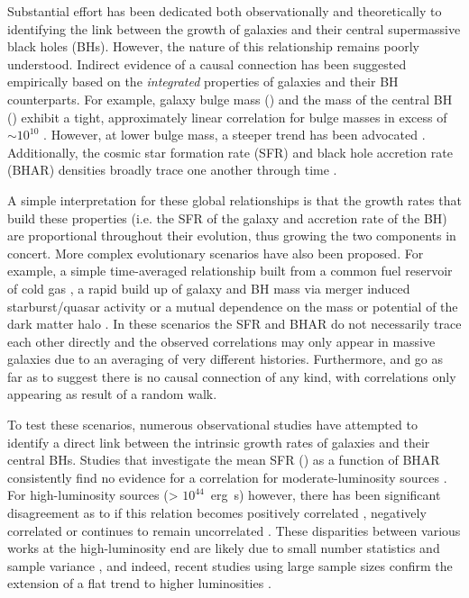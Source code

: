 Substantial effort has been dedicated both observationally and theoretically to
identifying the link between the growth of galaxies and their central
supermassive black holes (BHs). However, the nature of this relationship
remains poorly understood.  Indirect evidence of a causal connection has been
suggested empirically based on the \textit{integrated} properties of galaxies
and their BH counterparts. For example, galaxy bulge mass () and
the mass of the central BH () exhibit a tight, approximately linear
correlation for bulge masses in excess of  $\sim 10^{10}$\Msol
\citep[e.g,][]{Magorrian1998,Kormendy2013,McConnellandMa2013,Scott2013}.
However, at lower bulge mass, a steeper trend has been advocated
\citep[e.g,][]{Scott2013,Greene2016}.  Additionally, the cosmic star formation
rate (SFR) and black hole accretion rate (BHAR) densities broadly trace one
another through time
\citep[e.g,][]{Heckman2004,Aird2010,MadauandDickinson2014}.

A simple interpretation for these global relationships is that the growth rates
that build these properties (i.e. the SFR of the galaxy and accretion rate of
the BH) are proportional throughout their evolution, thus growing the two
components in concert. More complex evolutionary scenarios have also been
proposed. For example, a simple time-averaged relationship built from a common
fuel reservoir of cold gas \citep{AlexanderandHickox2012,Hickox2014}, a rapid
build up of galaxy and BH mass via merger induced starburst/quasar activity
\citep[e.g,][]{Sanders1988,DiMatteo2005,Hopkins2008} or a mutual dependence on
the mass or potential of the dark matter halo
\citep{BoothandSchaye2010,BoothandSchaye2011,Bower2017}.  In these scenarios
the SFR and BHAR do not necessarily trace each other directly and the observed
correlations may only appear in massive galaxies due to an averaging of very
different histories.  Furthermore, \citet{Peng2007} and \citet{Jahnke2011} go
as far as to suggest there is no causal connection of any kind, with correlations
only appearing as result of a random walk. 

To test these scenarios, numerous observational studies have attempted to
identify a direct link between the intrinsic growth rates of galaxies and their
central BHs. Studies that investigate the mean SFR () as a function of
BHAR consistently find no evidence for a correlation for moderate-luminosity
sources \citep[\LXray $\lesssim$ $10^{44}$~erg~s$^{-1}$;
e.g,][]{Lutz2010,Harrison2012,Page2012,Mullaney2012b,Rosario2012,Stanley2015,Azadi2015}.
For high-luminosity sources (\LXray > $10^{44}$~erg~s) however, there has been
significant disagreement as to if this relation becomes positively correlated
\citep[e.g.][]{Lutz2010}, negatively correlated \citep[e.g.][]{Page2012} or
continues to remain uncorrelated
\citep[e.g,][]{Harrison2012,Rosario2012,Stanley2015,Azadi2015}.  These
disparities between various works at the high-luminosity end are likely due to
small number statistics and sample variance \citep{Harrison2012}, and indeed,
recent studies using large sample sizes confirm the extension of a flat trend
to higher luminosities \citep{Stanley2015,Azadi2015}.

